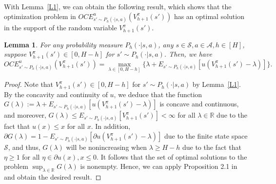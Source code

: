 \documentclass[11pt]{article}
\newtheorem{lemma}{Lemma}
\newcommand{\1}{\mathbbm{1}}
\begin{document}


With Lemma~\ref{L1}, we can obtain the following result, which shows that the optimization problem in $OCE^{u}_{s'\sim P_h(\cdot\vert s,a)}(V_{h+1}^{\pi}(s'))$ has an optimal solution in the support of the random variable $V_{h+1}^{\pi}(s')$.

\begin{lemma}\label{L2}
For any probability measure $P_h(\cdot\vert s,a)$, any $s\in \mathcal{S},a\in\mathcal{A},h\in [H]$, suppose $V_{h+1}^{\pi}(s')\in [0,H-h]$ for $s'\sim P_h(\cdot\vert s,a)$. Then, we have 
\begin{equation}\label{S1}
OCE^{u}_{s'\sim P_h(\cdot\vert s,a)}(V_{h+1}^{\pi}(s'))=\max_{\lambda\in [0,H-h]}\{\lambda+E_{s'\sim P_h(\cdot\vert s,a)}[u(V_{h+1}^{\pi}(s')-\lambda)]\}.
\end{equation}
\end{lemma}
\begin{proof}
Note that $V_{h+1}^{\pi}(s')\in [0,H-h]$ for $s'\sim P_h(\cdot\vert s,a)$ by Lemma~\ref{L1}.
By the concavity and continuity of $u$, we deduce that
the function $G(\lambda) :=\lambda+E_{s'\sim P_h(\cdot\vert s,a)}[u(V^{\pi}_{h+1}(s')-\lambda)]$ is concave and continuous, and moreover, $G(\lambda) \le E_{s'\sim P_h(\cdot\vert s,a)}[V^{\pi}_{h+1}(s')] < \infty$ for all $\lambda \in \mathbb{R}$ due to the fact that $u(x) \le x$ for all $x$. In addition, $\partial G(\lambda)=1-E_{s'\sim P_h(\cdot\vert s,a)}[\partial u(V_{h+1}^{\pi}(s')-\lambda)]$ due to the finite state space $\mathcal{S}$, and thus, $G(\lambda)$ will be nonincreasing when $\lambda\geq H-h$ due to the fact that $\eta\geq 1$ for all $\eta\in \partial u(x),x\leq 0$. It follows that the set of optimal solutions to the problem $\sup_{\lambda \in \mathbb{R}} G(\lambda)$ is nonempty. Hence, we can apply Proposition 2.1 in \cite{ben2007old} and obtain the desired result. 
\end{proof}
\end{document}
